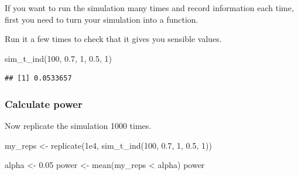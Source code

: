 \documentclass[
  oneside]{book}
\newenvironment{Shaded}{\begin{snugshade}}{\end{snugshade}}
\newcommand{\AttributeTok}[1]{\textcolor[rgb]{0.77,0.63,0.00}{#1}}
\newcommand{\CommentTok}[1]{\textcolor[rgb]{0.56,0.35,0.01}{\textit{#1}}}
\newcommand{\ConstantTok}[1]{\textcolor[rgb]{0.00,0.00,0.00}{#1}}
\newcommand{\ControlFlowTok}[1]{\textcolor[rgb]{0.13,0.29,0.53}{\textbf{#1}}}
\newcommand{\DecValTok}[1]{\textcolor[rgb]{0.00,0.00,0.81}{#1}}
\newcommand{\FloatTok}[1]{\textcolor[rgb]{0.00,0.00,0.81}{#1}}
\newcommand{\FunctionTok}[1]{\textcolor[rgb]{0.00,0.00,0.00}{#1}}
\newcommand{\NormalTok}[1]{#1}
\newcommand{\OtherTok}[1]{\textcolor[rgb]{0.56,0.35,0.01}{#1}}
\newcommand{\SpecialCharTok}[1]{\textcolor[rgb]{0.00,0.00,0.00}{#1}}
\begin{document}
If you want to run the simulation many times and record information each time, first you need to turn your simulation into a function.

\begin{Shaded}
\end{Shaded}

Run it a few times to check that it gives you sensible values.

\begin{Shaded}
\begin{Highlighting}[]
\FunctionTok{sim\_t\_ind}\NormalTok{(}\DecValTok{100}\NormalTok{, }\FloatTok{0.7}\NormalTok{, }\DecValTok{1}\NormalTok{, }\FloatTok{0.5}\NormalTok{, }\DecValTok{1}\NormalTok{)}
\end{Highlighting}
\end{Shaded}

\begin{verbatim}
## [1] 0.0533657
\end{verbatim}

\hypertarget{calc-power-t}{%
\subsubsection{Calculate power}\label{calc-power-t}}

Now replicate the simulation 1000 times.

\begin{Shaded}
\begin{Highlighting}[]
\NormalTok{my\_reps }\OtherTok{\textless{}{-}} \FunctionTok{replicate}\NormalTok{(}\FloatTok{1e4}\NormalTok{, }\FunctionTok{sim\_t\_ind}\NormalTok{(}\DecValTok{100}\NormalTok{, }\FloatTok{0.7}\NormalTok{, }\DecValTok{1}\NormalTok{, }\FloatTok{0.5}\NormalTok{, }\DecValTok{1}\NormalTok{))}

\NormalTok{alpha }\OtherTok{\textless{}{-}} \FloatTok{0.05}
\NormalTok{power }\OtherTok{\textless{}{-}} \FunctionTok{mean}\NormalTok{(my\_reps }\SpecialCharTok{\textless{}}\NormalTok{ alpha)}
\NormalTok{power}
\end{Highlighting}
\end{Shaded}
\end{document}

